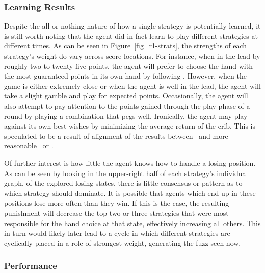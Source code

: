 


\subsubsection{Learning Results}


Despite the all-or-nothing nature of how a single strategy is potentially
learned,
it is still worth noting that the agent did in fact learn to play different
strategies at different times.
%
As can be seen in Figure~\ref{fig_r1-strats},
the strengths of each strategy's weight do vary across score-locations.
%
For instance, when in the lead by
roughly two to twenty five points,
the agent will prefer to choose the hand with the most guaranteed
points in its own hand
by following \handmaxmin.
%
However, when the game is either extremely close
or when the agent is well in the lead,
the agent will take a slight gamble and play for expected points.
%
Occasionally, the agent will also attempt to pay attention to the points
gained through the play phase of a round by playing a combination that pegs
well.
%
Ironically,
the agent may play against its own best wishes by minimizing the average return
of the crib.
%
This is speculated to be a result of alignment of the results between
\cribminavg\ and more reasonable \handmaxmin\
or \handmaxavg.

Of further interest is how little the agent knows how to handle a losing
position.
%
As can be seen by looking in the upper-right half of each strategy's
individual graph,
of the explored losing states,
there is little consensus or pattern as to which strategy should dominate.
%
It is possible that agents which end up in these positions lose more often than
they win.
%
If this is the case,
the resulting punishment will decrease the top two or three strategies that were
most responsible for the hand choice at that state,
effectively increasing all others.
%
This in turn would likely later lead to a cycle in which different strategies
are cyclically placed in a role of strongest weight,
generating the fuzz seen now.


\subsubsection{Performance}

